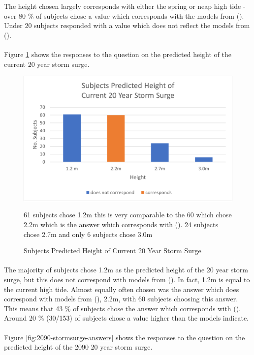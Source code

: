 The height chosen largely corresponds with either the spring or neap high tide - over 80 \% of subjects chose a value which corresponds with the models from (\cite{kartverket_se_2021}). Under 20 subjects responded with a value which does not reflect the models from (\cite{kartverket_se_2021}). 
\paragraph{}
Figure \ref{fig:2022-stormsurge-answers} shows the responses to the question on the predicted height of the current 20 year storm surge. 
\begin{figure}[H]
    \centering
    \includegraphics{fig_results/2022-20yrss-answer.png}
    \caption{Subjects Predicted Height of Current 20 Year Storm Surge}{ 61 subjects chose 1.2m this is very comparable to the 60 which chose 2.2m which is the answer which corresponds with (\cite{kartverket_se_2021}). 24 subjects chose 2.7m and only 6 subjects chose 3.0m}
    \label{fig:2022-stormsurge-answers}
\end{figure}
\paragraph{}
The majority of subjects chose 1.2m as the predicted height of the 20 year storm surge, but this does not correspond with models from (\cite{kartverket_se_2021}). In fact, 1.2m is equal to the current high tide. Almost equally often chosen was the answer which does correspond with models from (\cite{kartverket_se_2021}), 2.2m, with 60 subjects choosing this answer. This means that 43 \% of subjects chose the answer which corresponds with (\cite{kartverket_se_2021}). Around 20 \% (30/153) of subjects chose a value higher than the models indicate.
\paragraph{}
Figure \ref{fig:2090-stormsurge-answers} shows the responses to the question on the predicted height of the 2090 20 year storm surge.

